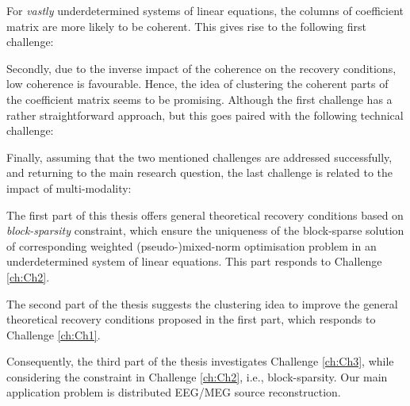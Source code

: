 For \emph{vastly} underdetermined systems of linear equations, the columns of coefficient matrix are more likely to be coherent. 
This gives rise to the following first challenge:
\begin{challenge}
\label{ch:Ch1}

\end{challenge}
Secondly, due to the inverse impact of the coherence on the recovery conditions, low coherence is favourable.
Hence, the idea of clustering the coherent parts of the coefficient matrix seems to be promising.
Although the first challenge has a rather straightforward approach, but this goes paired with the following technical challenge:
\begin{challenge}
\label{ch:Ch2}

\end{challenge}
Finally, assuming that the two mentioned challenges are addressed successfully, and returning to the main research question, the last challenge is related to the impact of multi-modality:
\begin{challenge}
\label{ch:Ch3}

\end{challenge}


The first part of this thesis offers general theoretical recovery conditions based on \emph{block-sparsity} constraint, which ensure the uniqueness of the block-sparse solution of corresponding weighted (pseudo-)mixed-norm optimisation problem in an underdetermined system of linear equations.
This part responds to Challenge \ref{ch:Ch2}.

The second part of the thesis suggests the clustering idea to improve the general theoretical recovery conditions proposed in the first part, which responds to Challenge \ref{ch:Ch1}.

Consequently, the third part of the thesis investigates Challenge \ref{ch:Ch3}, while considering the constraint in Challenge \ref{ch:Ch2}, i.e., block-sparsity.
Our main application problem is distributed EEG/MEG source reconstruction.

